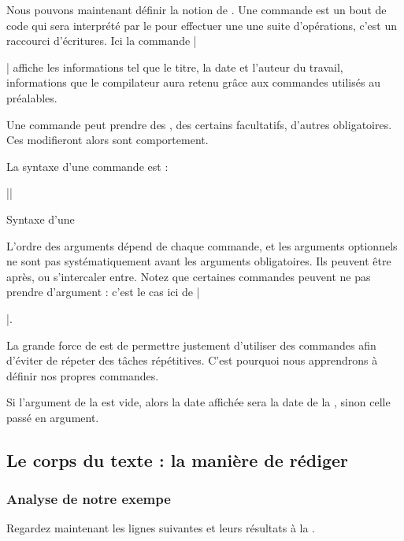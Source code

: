 Nous pouvons maintenant définir la notion de . Une commande est un bout de code qui sera interprété par le  pour effectuer une une suite d'opérations, c'est un raccourci d'écritures. 
Ici la commande |\maketitle| affiche les informations tel que le titre, la date et l'auteur du travail, informations que le compilateur aura retenu grâce aux commandes utilisés au préalables.

Une commande peut prendre des , des  certains facultatifs, d'autres obligatoires. Ces  modifieront alors sont comportement.

La syntaxe d'une commande est :

\begin{listing}[ht]
||
\caption{Syntaxe d'une }
\end{listing}

L'ordre des arguments dépend de chaque commande, et les arguments optionnels ne sont pas systématiquement avant les arguments obligatoires. Ils peuvent être après, ou s'intercaler entre. Notez que certaines commandes peuvent ne pas prendre d'argument : c'est le cas ici de |\maketitle|.

La grande force de  est de permettre justement d'utiliser des commandes afin d'éviter de répeter des tâches répétitives. C'est pourquoi nous apprendrons à définir nos propres commandes.

Si l'argument de la   est vide, alors la date affichée  sera la date de la , sinon celle passé en argument.

\subsection{Le corps du texte : la manière de rédiger}

\subsubsection{Analyse de notre exempe}
Regardez maintenant les lignes suivantes et leurs résultats à la .

